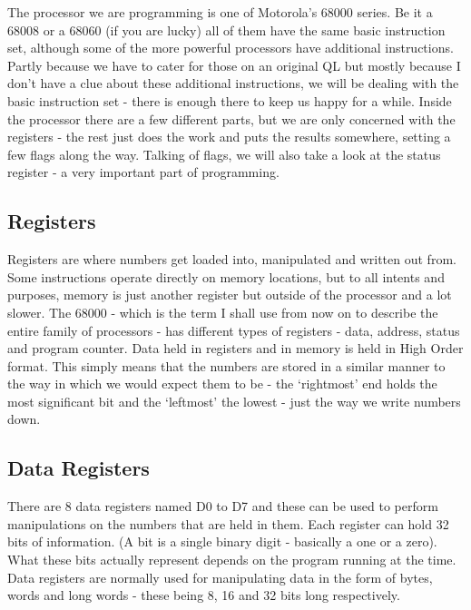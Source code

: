 The processor we are programming is one of Motorola's 68000 series.
    Be it a 68008 or a 68060 (if you are lucky) all of them have the same
    basic instruction set, although some of the more powerful processors have
    additional instructions. Partly because we have to cater for those on an
    original QL but mostly because I don't have a clue about these additional
    instructions, we will be dealing with the basic instruction set -{} there is
    enough there to keep us happy for a while. Inside the processor there are
    a few different parts, but we are only concerned with the registers -{} the
    rest just does the work and puts the results somewhere, setting a few
    flags along the way. Talking of flags, we will also take a look at the
    status register -{} a very important part of programming.

\subsection{Registers}

Registers are where numbers get loaded into, manipulated and
      written out from. Some instructions operate directly on memory
      locations, but to all intents and purposes, memory is just another
      register but outside of the processor and a lot slower. The 68000 -{}
      which is the term I shall use from now on to describe the entire family
      of processors -{} has different types of registers -{} data, address, status
      and program counter. Data held in registers and in memory is held in
      High Order format. This simply means that the numbers are stored in a
      similar manner to the way in which we would expect them to be -{} the
      `rightmost' end holds the most significant bit and the `leftmost' the
      lowest -{} just the way we write numbers down.

\subsection{Data Registers}

There are 8 data registers named D0 to D7 and these can be used to
      perform manipulations on the numbers that are held in them. Each
      register can hold 32 bits of information. (A bit is a single binary
      digit -{} basically a one or a zero). What these bits actually represent
      depends on the program running at the time. Data registers are normally
      used for manipulating data in the form of bytes, words and long words -{}
      these being 8, 16 and 32 bits long respectively.

